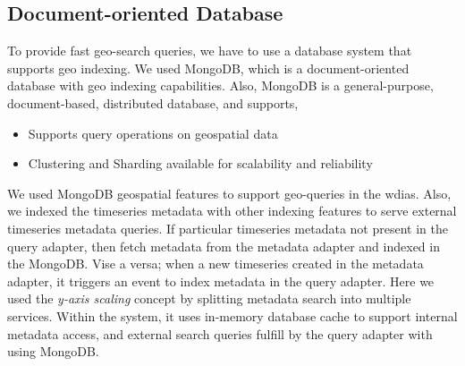 \subsection{Document-oriented Database}
\label{subse:mongodb}

To provide fast geo-search queries, we have to use a database system that supports geo indexing. We used MongoDB, which is a document-oriented database with geo indexing capabilities. Also, MongoDB \cite{mongodbMongoDBManual} is a general-purpose, document-based, distributed database, and supports,

\begin{itemize}
  \item Supports query operations on geospatial data \cite{mongodbMongoDBManual}
  \item Clustering and Sharding available for scalability and reliability
\end{itemize}

We used MongoDB geospatial features to support geo-queries in the \acrshort{wdias}. Also, we indexed the timeseries metadata with other indexing features to serve external timeseries metadata queries. If particular timeseries metadata not present in the query adapter, then fetch metadata from the metadata adapter and indexed in the MongoDB. Vise a versa; when a new timeseries created in the metadata adapter, it triggers an event to index metadata in the query adapter.
Here we used the \emph{y-axis scaling} concept by splitting metadata search into multiple services. Within the system, it uses in-memory database cache to support internal metadata access, and external search queries fulfill by the query adapter with using MongoDB.
